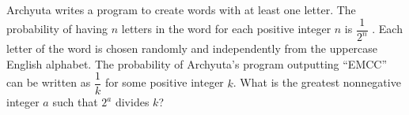Archyuta writes a program to create words with at least one letter. The probability of having $n$ letters in the word for each positive integer $n$ is $\dfrac{1}{2^n}$ . Each letter of the word is chosen randomly and independently from the uppercase English alphabet. The probability of Archyuta's program outputting ``EMCC'' can be written as $\dfrac{1}{k}$ for some positive integer $k$. What is the greatest nonnegative integer $a$ such that $2^a$ divides $k$?
